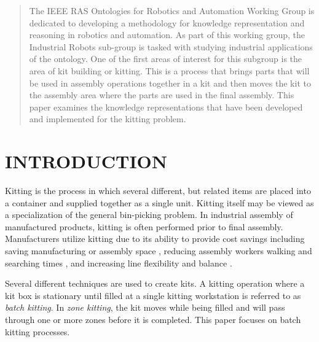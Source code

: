 






\maketitle
\thispagestyle{empty}
\pagestyle{empty}


\begin{abstract}

The IEEE RAS Ontologies for Robotics and Automation Working Group is dedicated to developing a methodology for knowledge representation and reasoning in robotics and automation. As part of this working group, the Industrial Robots sub-group is tasked with studying industrial applications of the ontology. One of the first areas of interest for this subgroup is the area of kit building or kitting. This is a process that brings parts that will be used in assembly operations together in a kit and then moves the kit to the assembly area where the parts are used in the final assembly. This paper examines the knowledge representations that have been developed and implemented for the kitting problem.

\end{abstract}


\section{INTRODUCTION}
Kitting is the process in which several different, but related items are placed into a container and supplied together as a single unit.
Kitting itself may be viewed as a specialization of the general bin-picking problem.
In industrial assembly of manufactured products, kitting is often performed prior to final assembly. Manufacturers utilize kitting
due to its ability to provide cost savings \cite{Carlsson_2008} including saving manufacturing or assembly space \cite{Medbo2003}, reducing assembly workers walking and searching times \cite{Schwind1992}, and increasing line flexibility \cite{Bozer1992} and balance \cite{Jiao2000}.

Several different techniques are used to create kits. A kitting operation where a kit box is stationary until filled at a single
kitting workstation is referred to as {\it batch kitting}. In {\it zone kitting}, the kit moves while being filled and will pass through one or
more zones before it is completed. This paper focuses on batch kitting processes.

